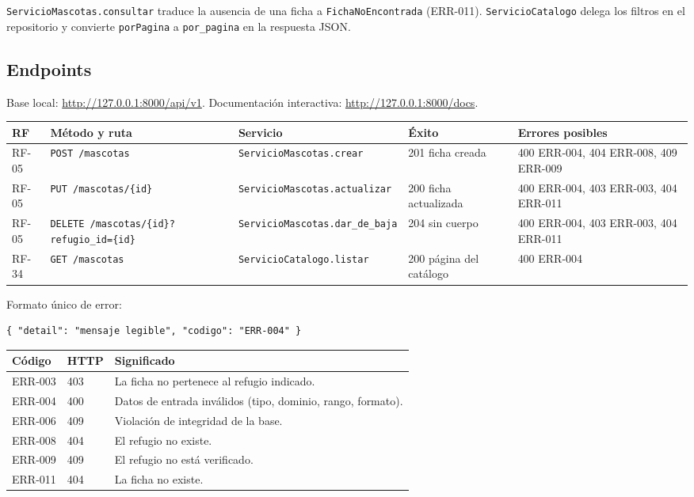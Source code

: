 \documentclass[11pt,a4paper]{article}
\newcommand{\code}[1]{\texttt{#1}}
\newcommand{\thead}[1]{\textbf{#1}}
\begin{document}
\code{ServicioMascotas.consultar} traduce la ausencia de una ficha a
\code{FichaNoEncontrada} (ERR-011). \code{ServicioCatalogo} delega los filtros
en el repositorio y convierte \code{porPagina} a \code{por\_pagina} en la
respuesta JSON.

\subsection{Endpoints}

Base local: \url{http://127.0.0.1:8000/api/v1}. Documentación interactiva:
\url{http://127.0.0.1:8000/docs}.

{\footnotesize
\begin{tabularx}{\linewidth}{@{}V{0.35}V{1.35}V{1.2}V{0.9}V{1.2}@{}}
\toprule
\thead{RF} & \thead{Método y ruta} & \thead{Servicio} & \thead{Éxito} &
\thead{Errores posibles} \\ \midrule
RF-05 & \code{POST /mascotas} & \code{ServicioMascotas.crear} &
201 ficha creada & 400 ERR-004, 404 ERR-008, 409 ERR-009 \\
RF-05 & \code{PUT /mascotas/\{id\}} & \code{ServicioMascotas.actualizar} &
200 ficha actualizada & 400 ERR-004, 403 ERR-003, 404 ERR-011 \\
RF-05 & \code{DELETE /mascotas/\{id\}?refugio\_id=\{id\}} &
\code{ServicioMascotas.dar\_de\_baja} & 204 sin cuerpo &
400 ERR-004, 403 ERR-003, 404 ERR-011 \\
RF-34 & \code{GET /mascotas} & \code{ServicioCatalogo.listar} &
200 página del catálogo & 400 ERR-004 \\
\bottomrule
\end{tabularx}
}

Formato único de error:

\begin{lstlisting}
{ "detail": "mensaje legible", "codigo": "ERR-004" }
\end{lstlisting}

{\footnotesize
\begin{tabularx}{\linewidth}{@{}V{0.5}V{0.5}V{2.0}@{}}
\toprule
\thead{Código} & \thead{HTTP} & \thead{Significado} \\ \midrule
ERR-003 & 403 & La ficha no pertenece al refugio indicado. \\
ERR-004 & 400 & Datos de entrada inválidos (tipo, dominio, rango, formato). \\
ERR-006 & 409 & Violación de integridad de la base. \\
ERR-008 & 404 & El refugio no existe. \\
ERR-009 & 409 & El refugio no está verificado. \\
ERR-011 & 404 & La ficha no existe. \\
\bottomrule
\end{tabularx}
}
\end{document}
